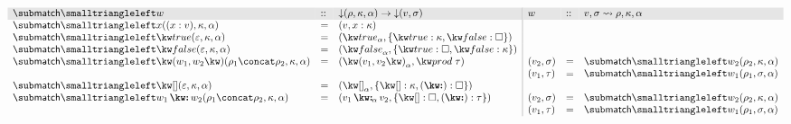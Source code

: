 $\begin{array}{lll|lll}
   \arrayrulecolor{lightgray}
   \rowcolor{verylightgray}
   \matchBwdF{w} &::& \Below{(\rho,\kappa, \alpha)} \to \Below{(v,\sigma)}
   &w &::& v, \sigma \match \rho, \kappa, \alpha
   \\
   \matchBwdF{\matchVar{x}}(\bind{x}{v}, \kappa, \alpha)
   &=&
   (v, \elimVar{x}{\kappa})
   \\
   \matchBwdF{\matchTrue}(\seqEmpty, \kappa, \alpha)
   &=&
   (\annTrue{\alpha}, \elimBool{\kappa}{\hole})
   \\
   \matchBwdF{\matchFalse}(\seqEmpty, \kappa, \alpha)
   &=&
   (\annFalse{\alpha}, \elimBool{\hole}{\kappa})
   \\
   \matchBwdF{\matchPair{w_1}{w_2}}(\rho_1 \concat \rho_2, \kappa, \alpha)
   &=&
   (\annPair{v_1}{v_2}{\alpha}, \elimProd{\tau})
   &
   (v_2, \sigma) &=& \matchBwdF{w_2}(\rho_2, \kappa, \alpha)
   \\
   &&&
   (v_1, \tau) &=& \matchBwdF{w_1}(\rho_1, \sigma, \alpha)
   \\
   \matchBwdF{\matchNil}(\seqEmpty,\kappa,\alpha)
   &=&
   (\annNil{\alpha}, \elimList{\kappa}{\hole})
   \\
   \matchBwdF{\matchCons{w_1}{w_2}}(\rho_1 \concat \rho_2, \kappa, \alpha)
   &=&
   (\annCons{v_1}{v_2}{\alpha}, \elimList{\hole}{\tau})
   &
   (v_2, \sigma) &=& \matchBwdF{w_2}(\rho_2, \kappa, \alpha)
   \\
   &&&
   (v_1, \tau) &=& \matchBwdF{w_1}(\rho_1, \sigma, \alpha)
\end{array}$\\

